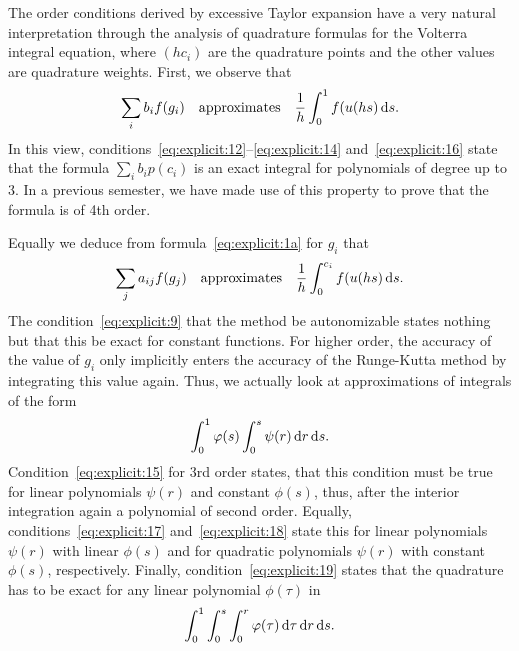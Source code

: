 \begin{remark}
  The order conditions derived by excessive Taylor expansion have a
  very natural interpretation through the analysis of quadrature
  formulas for the Volterra integral equation, where $(h c_i)$ are the
  quadrature points and the other values are quadrature weights.
  First, we observe that
  \begin{gather*}
    \sum_i b_i f(g_i) \quad\text{approximates}\quad
    \frac1h\int_0^1 f(u(h s)\,\mathrm{d} s.
  \end{gather*}
  In this view,
  conditions~\eqref{eq:explicit:12}--\eqref{eq:explicit:14}
  and~\eqref{eq:explicit:16} state that the formula $\sum_i b_i
  p(c_i)$ is an exact integral for polynomials of degree up to 3. In a
  previous semester, we have made use of this property to prove that
  the formula is of 4th order.

  Equally we deduce from formula~\eqref{eq:explicit:1a} for $g_i$ that
  \begin{gather*}
    \sum_j a_{ij} f(g_j) \quad\text{approximates}\quad
    \frac1h\int_0^{c_i} f(u(h s)\,\mathrm{d} s.
  \end{gather*}
  The condition~\eqref{eq:explicit:9} that the method be autonomizable
  states nothing but that this be exact for constant functions. For
  higher order, the accuracy of the value of $g_i$ only implicitly
  enters the accuracy of the Runge-Kutta method by integrating this
  value again. Thus, we actually look at approximations of integrals
  of the form
  \begin{gather*}
    \int_0^1 \varphi(s) \int_0^s \psi(r) \,\mathrm{d} r\,\mathrm{d} s.
  \end{gather*}
  Condition~\eqref{eq:explicit:15} for 3rd order states, that this
  condition must be true for linear polynomials $\psi(r)$ and constant
  $\phi(s)$, thus, after the interior integration again a polynomial
  of second order. Equally, conditions~\eqref{eq:explicit:17}
  and~\eqref{eq:explicit:18} state this for linear polynomials
  $\psi(r)$ with linear $\phi(s)$ and for quadratic polynomials
  $\psi(r)$ with constant $\phi(s)$, respectively. Finally,
  condition~\eqref{eq:explicit:19} states that the quadrature has to
  be exact for any linear polynomial $\phi(\tau)$ in
  \begin{gather*}
    \int_0^1 \int_0^s \int_0^r \varphi(\tau) \,\mathrm{d} \tau\,\mathrm{d} r\,\mathrm{d} s.
  \end{gather*}
\end{remark}

